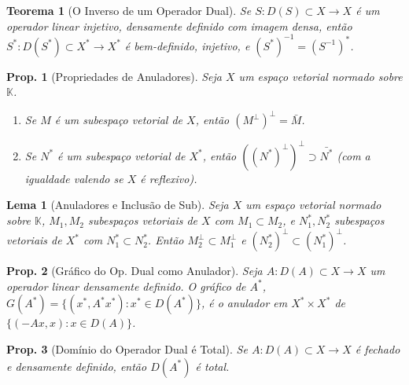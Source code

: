 \documentclass[11pt]{article}
\theoremstyle{yellowhead}
\newtheorem*{theorem}{Teorema}
\newtheorem*{lemma}{Lema}
\newtheorem*{proposition}{Prop.}
\theoremstyle{yellowdef}
\begin{document}
\begin{multicols}{3}
\begin{theorem}[O Inverso de um Operador Dual]
Se $S: D(S) \subset X \to X$ é um operador linear injetivo, densamente definido com imagem densa, então $S^*: D(S^*) \subset X^* \to X^*$ é bem-definido, injetivo, e $(S^*)^{-1} = (S^{-1})^*$.
\end{theorem}

\begin{proposition}[Propriedades de Anuladores]
Seja $X$ um espaço vetorial normado sobre $\mathbb{K}$.
\begin{enumerate}
    \item Se $M$ é um subespaço vetorial de $X$, então $(M^\perp)^\perp = \bar{M}$.
    \item Se $N^*$ é um subespaço vetorial de $X^*$, então $((N^*)^\perp)^\perp \supset \bar{N^*}$ (com a igualdade valendo se $X$ é reflexivo).
\end{enumerate}
\end{proposition}

\begin{lemma}[Anuladores e Inclusão de Sub]
Seja $X$ um espaço vetorial normado sobre $\mathbb{K}$, $M_1, M_2$ subespaços vetoriais de $X$ com $M_1 \subset M_2$, e $N_1^*, N_2^*$ subespaços vetoriais de $X^*$ com $N_1^* \subset N_2^*$. Então $M_2^\perp \subset M_1^\perp$ e $(N_2^*)^\perp \subset (N_1^*)^\perp$.
\end{lemma}

\begin{proposition}[Gráfico do Op. Dual como Anulador]
Seja $A: D(A) \subset X \to X$ um operador linear densamente definido. O gráfico de $A^*$, $G(A^*) = \{(x^*, A^*x^*) : x^* \in D(A^*)\}$, é o anulador em $X^* \times X^*$ de $\{(-Ax, x) : x \in D(A)\}$.
\end{proposition}

\begin{proposition}[Domínio do Operador Dual é Total]
Se $A: D(A) \subset X \to X$ é fechado e densamente definido, então $D(A^*)$ é total.
\end{proposition}
\end{multicols}
\end{document}
